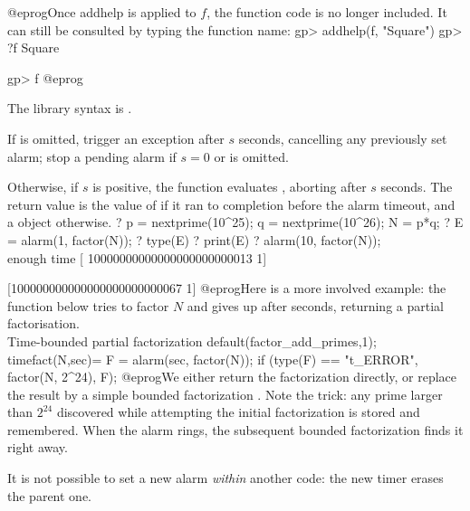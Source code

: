 @eprog\noindent Once addhelp is applied to $f$, the function code is no
longer included. It can still be consulted by typing the function name:
\bprog
gp> addhelp(f, "Square")
gp> ?f
Square

gp> f
@eprog

The library syntax is .

\label{se:alarm}
If  is omitted, trigger an  exception after $s$
seconds, cancelling any previously set alarm; stop a pending alarm if $s =
0$ or is omitted.

Otherwise, if $s$ is positive, the function evaluates ,
aborting after $s$ seconds. The return value is the value of  if
it ran to completion before the alarm timeout, and a  object
otherwise.
\bprog
  ? p = nextprime(10^25); q = nextprime(10^26); N = p*q;
  ? E = alarm(1, factor(N));
  ? type(E)
  ? print(E)
  ? alarm(10, factor(N));   \\ enough time
  [ 10000000000000000000000013 1]

  [100000000000000000000000067 1]
@eprog\noindent Here is a more involved example: the function
 below tries to factor $N$ and gives up after 
seconds, returning a partial factorisation.
\bprog
\\ Time-bounded partial factorization
default(factor_add_primes,1);
timefact(N,sec)=
{
  F = alarm(sec, factor(N));
  if (type(F) == "t_ERROR", factor(N, 2^24), F);
}
@eprog\noindent We either return the factorization directly, or replace the
 result by a simple bounded factorization .
Note the  trick: any prime larger than $2^{24}$
discovered while attempting the initial factorization is stored and
remembered. When the alarm rings, the subsequent bounded factorization finds
it right away.

 It is not possible to set a new alarm \emph{within}
another  code: the new timer erases the parent one.

